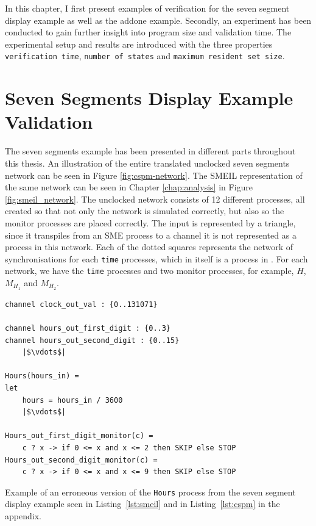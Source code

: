 
In this chapter, I first present examples of verification for the seven segment display example as well as the addone example. Secondly, an experiment has been conducted to gain further insight into program size and validation time. The experimental setup and results are introduced with the three properties \texttt{verification time}, \texttt{number of states} and \texttt{maximum resident set size}.

\section{Seven Segments Display Example Validation}
The seven segments example has been presented in different parts throughout this thesis. An illustration of the entire translated unclocked seven segments network can be seen in Figure \ref{fig:cspm-network}. The SMEIL representation of the same network can be seen in Chapter \ref{chap:analysis} in Figure \ref{fig:smeil_network}.
The unclocked \cspm{} network consists of 12 different processes, all created so that not only the network is simulated correctly, but also so the monitor processes are placed correctly. The input is represented by a triangle, since it transpiles from an SME process to a \cspm{} channel it is not represented as a process in this network. Each of the dotted squares represents the network of synchronisations for each \texttt{time} processes, which in itself is a process in \cspm{}. For each network, we have the \texttt{time} processes and two monitor processes, for example, $H$, $M_{H_1}$ and $M_{H_2}$.
\\

\begin{listing}
\begin{verbatim}
channel clock_out_val : {0..131071}

channel hours_out_first_digit : {0..3}
channel hours_out_second_digit : {0..15}
    |$\vdots$|

Hours(hours_in) =
let
    hours = hours_in / 3600
    |$\vdots$|

Hours_out_first_digit_monitor(c) =
    c ? x -> if 0 <= x and x <= 2 then SKIP else STOP
Hours_out_second_digit_monitor(c) =
    c ? x -> if 0 <= x and x <= 9 then SKIP else STOP

\end{verbatim}
\caption{Example of an erroneous version of the \texttt{Hours} process from the \cspm{} seven segment display example seen in Listing~\ref{lst:smeil} and in Listing~\ref{lst:cspm} in the appendix.}
\label{lst:cspm_error}
\end{listing}

